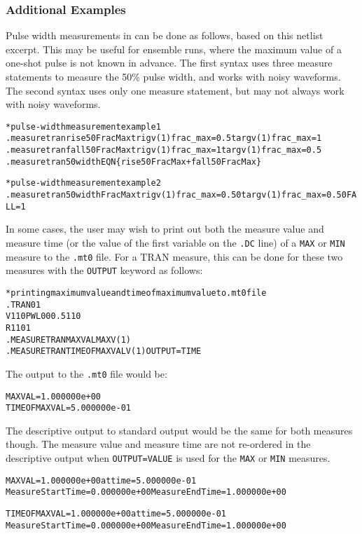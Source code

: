 \subsubsection{Additional Examples}
\label{Measure_Additional_Examples}
Pulse width measurements in \Xyce{} can be done as follows, based on
this netlist excerpt.  This may be useful for ensemble runs, where the
maximum value of a one-shot pulse is not known in advance.  The first
syntax uses three measure statements to measure the 50\% pulse width,
and works with noisy waveforms.  The second syntax uses only one
measure statement, but may not always work with noisy waveforms.

\begin{alltt}
* pulse-width measurement example 1
.measure tran rise50FracMax trig v(1) frac_max=0.5 targ v(1) frac_max=1
.measure tran fall50FracMax trig v(1) frac_max=1 targ v(1) frac_max=0.5
.measure tran 50width EQN\{rise50FracMax + fall50FracMax\}

* pulse-width measurement example 2
.measure tran 50widthFracMax trig v(1) frac_max=0.50 targ v(1) frac_max=0.50 FALL=1
\end{alltt}

In some cases, the user may wish to print out both the measure value
and measure time (or the value of the first variable on the {\tt .DC}
line) of a
\texttt{MAX} or \texttt{MIN} measure to the \texttt{.mt0} file.  For a TRAN measure,
this can be done for these two measures with the \texttt{OUTPUT}
keyword as follows:
\begin{alltt}
* printing maximum value and time of maximum value to .mt0 file
.TRAN 0 1
V1 1 0 PWL 0 0 0.5 1 1 0
R1 1 0 1
.MEASURE TRAN MAXVAL MAX V(1)
.MEASURE TRAN TIMEOFMAXVAL V(1) OUTPUT=TIME
\end{alltt}
The output to the \texttt{.mt0} file would be:
\begin{alltt}
MAXVAL = 1.000000e+00
TIMEOFMAXVAL = 5.000000e-01
\end{alltt}
The descriptive output to standard output would be the same for both
measures though.  The measure value and measure time are not
re-ordered in the descriptive output when \texttt{OUTPUT=VALUE} is
used for the \texttt{MAX} or
\texttt{MIN} measures.
\begin{alltt}
MAXVAL = 1.000000e+00 at time = 5.000000e-01
Measure Start Time= 0.000000e+00        Measure End Time= 1.000000e+00

TIMEOFMAXVAL = 1.000000e+00 at time = 5.000000e-01
Measure Start Time= 0.000000e+00        Measure End Time= 1.000000e+00
\end{alltt}

